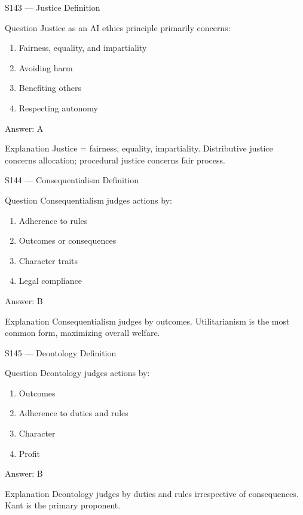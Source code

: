 \documentclass[aspectratio=169,8pt]{beamer}
\begin{document}
	\begin{frame}{S143 --- Justice Definition}
		\begin{block}{Question}
			Justice as an AI ethics principle primarily concerns:
			\begin{enumerate}
				\item Fairness, equality, and impartiality
				\item Avoiding harm
				\item Benefiting others
				\item Respecting autonomy
			\end{enumerate}
		\end{block}
		\begin{exampleblock}{Answer: A}\end{exampleblock}
		\begin{block}{Explanation}
			Justice = fairness, equality, impartiality. Distributive justice concerns allocation; procedural justice concerns fair process.
		\end{block}
	\end{frame}
	
	\begin{frame}{S144 --- Consequentialism Definition}
		\begin{block}{Question}
			Consequentialism judges actions by:
			\begin{enumerate}
				\item Adherence to rules
				\item Outcomes or consequences
				\item Character traits
				\item Legal compliance
			\end{enumerate}
		\end{block}
		\begin{exampleblock}{Answer: B}\end{exampleblock}
		\begin{block}{Explanation}
			Consequentialism judges by outcomes. Utilitarianism is the most common form, maximizing overall welfare.
		\end{block}
	\end{frame}
	
	\begin{frame}{S145 --- Deontology Definition}
		\begin{block}{Question}
			Deontology judges actions by:
			\begin{enumerate}
				\item Outcomes
				\item Adherence to duties and rules
				\item Character
				\item Profit
			\end{enumerate}
		\end{block}
		\begin{exampleblock}{Answer: B}\end{exampleblock}
		\begin{block}{Explanation}
			Deontology judges by duties and rules irrespective of consequences. Kant is the primary proponent.
		\end{block}
	\end{frame}
	
\end{document}
